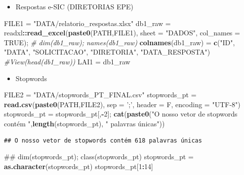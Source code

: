 \documentclass[]{article}
\newenvironment{Shaded}{\begin{snugshade}}{\end{snugshade}}
\newcommand{\KeywordTok}[1]{\textcolor[rgb]{0.13,0.29,0.53}{\textbf{#1}}}
\newcommand{\DataTypeTok}[1]{\textcolor[rgb]{0.13,0.29,0.53}{#1}}
\newcommand{\DecValTok}[1]{\textcolor[rgb]{0.00,0.00,0.81}{#1}}
\newcommand{\StringTok}[1]{\textcolor[rgb]{0.31,0.60,0.02}{#1}}
\newcommand{\CommentTok}[1]{\textcolor[rgb]{0.56,0.35,0.01}{\textit{#1}}}
\newcommand{\OtherTok}[1]{\textcolor[rgb]{0.56,0.35,0.01}{#1}}
\newcommand{\OperatorTok}[1]{\textcolor[rgb]{0.81,0.36,0.00}{\textbf{#1}}}
\newcommand{\NormalTok}[1]{#1}
\providecommand{\tightlist}{%
  \setlength{\itemsep}{0pt}\setlength{\parskip}{0pt}}
\begin{document}
\begin{itemize}
\tightlist
\item
  Respostas e-SIC (DIRETORIAS EPE)
\end{itemize}

\begin{Shaded}
\begin{Highlighting}[]
\NormalTok{FILE1 =}\StringTok{ "DATA/relatorio_respostas.xlsx"}
\NormalTok{db1_raw =}\StringTok{ }\NormalTok{readxl}\OperatorTok{::}\KeywordTok{read_excel}\NormalTok{(}\KeywordTok{paste0}\NormalTok{(PATH,FILE1), }\DataTypeTok{sheet =} \StringTok{"DADOS"}\NormalTok{, }\DataTypeTok{col_names =} \OtherTok{TRUE}\NormalTok{); }
\CommentTok{# dim(db1_raw); names(db1_raw)}
\KeywordTok{colnames}\NormalTok{(db1_raw) =}\StringTok{ }\KeywordTok{c}\NormalTok{(}\StringTok{"ID"}\NormalTok{, }\StringTok{"DATA"}\NormalTok{, }\StringTok{"SOLICITACAO"}\NormalTok{, }\StringTok{"DIRETORIA"}\NormalTok{, }\StringTok{"DATA_RESPOSTA"}\NormalTok{)}
\CommentTok{#View(head(db1_raw))}
\NormalTok{LAI1 =}\StringTok{ }\NormalTok{db1_raw}
\end{Highlighting}
\end{Shaded}

\begin{itemize}
\tightlist
\item
  Stopwords
\end{itemize}

\begin{Shaded}
\begin{Highlighting}[]
\NormalTok{FILE2 =}\StringTok{ "DATA/stopwords_PT_FINAL.csv"}
\NormalTok{stopwords_pt =}\StringTok{ }\KeywordTok{read.csv}\NormalTok{(}\KeywordTok{paste0}\NormalTok{(PATH,FILE2), }\DataTypeTok{sep =} \StringTok{';'}\NormalTok{, }\DataTypeTok{header =}\NormalTok{ F, }\DataTypeTok{encoding =} \StringTok{"UTF-8"}\NormalTok{)}
\NormalTok{stopwords_pt =}\StringTok{ }\NormalTok{stopwords_pt[,}\OperatorTok{-}\DecValTok{2}\NormalTok{]; }
\KeywordTok{cat}\NormalTok{(}\KeywordTok{paste0}\NormalTok{(}\StringTok{"O nosso vetor de stopwords contém "}\NormalTok{,}\KeywordTok{length}\NormalTok{(stopwords_pt), }\StringTok{" palavras únicas"}\NormalTok{))}
\end{Highlighting}
\end{Shaded}

\begin{verbatim}
## O nosso vetor de stopwords contém 618 palavras únicas
\end{verbatim}

\begin{Shaded}
\begin{Highlighting}[]
\NormalTok{## dim(stopwords_pt); class(stopwords_pt)}
\NormalTok{stopwords_pt =}\StringTok{ }\KeywordTok{as.character}\NormalTok{(stopwords_pt)}
\NormalTok{stopwords_pt[}\DecValTok{1}\OperatorTok{:}\DecValTok{14}\NormalTok{]}
\end{Highlighting}
\end{Shaded}
\end{document}
